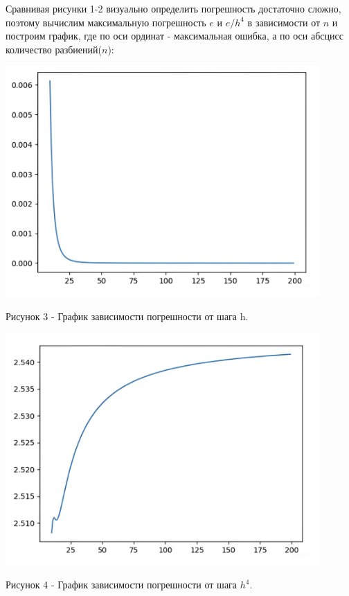 \documentclass[a4paper,14pt]{extreport}
\begin{document}
Сравнивая рисунки 1-2 визуально определить погрешность достаточно сложно, поэтому вычислим максимальную погрешность $e$ и $e/h^4$ в зависи\-мости от $n$ и построим график, где по оси ординат - максимальная ошибка, а по оси абсцисс количество разбиений($n$):
\begin{center}
    \begin{minipage}[htb]{0.7\linewidth}
    \includegraphics[width=12cm]{3.png}
    \end{minipage}
    \end{center}
    \begin{center}
    Рисунок 3 - График зависимости погрешности от шага h.
    \end{center}
    \begin{center}
    \begin{minipage}[htb]{0.7\linewidth}
    \includegraphics[width=12cm]{4.png}
    \end{minipage}
    \end{center}
    \begin{center}
    Рисунок 4 - График зависимости погрешности от шага $h^4$.
    \end{center}
\end{document}
